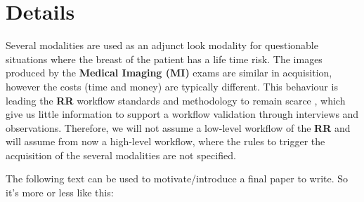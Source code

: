 
\section*{Details}

Several modalities \cite{kopans2004breast} are used as an adjunct look modality for questionable situations where the breast of the patient has a life time risk. The images produced by the \textbf{Medical Imaging (MI)} exams are similar in acquisition, however the costs (time and money) are typically different. This behaviour is leading the \textbf{RR} workflow standards and methodology to remain scarce \cite{rawson2016lessons, saltzherr2013cost}, which give us little information to support a workflow validation through interviews and observations. Therefore, we will not assume a low-level workflow of the \textbf{RR} and will assume from now a high-level workflow, where the rules to trigger the acquisition of the several modalities are not specified.

\hfill

The following text can be used to motivate/introduce a final paper to write. So it's more or less like this:


\hfill

